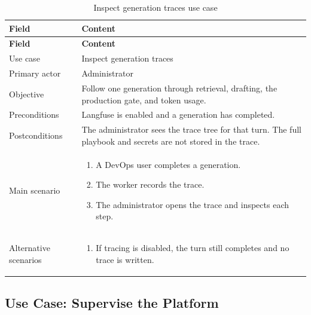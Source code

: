 \begingroup
\footnotesize
\renewcommand{\arraystretch}{1.15}
\begin{longtable}{|L{3.2cm}|L{11.6cm}|}
\caption{Inspect generation traces use case}
\label{tab:use-case-inspect-traces} \\
\hline
{}
\textbf{Field} & \textbf{Content} \\
\hline
\endfirsthead
\hline
{}
\textbf{Field} & \textbf{Content} \\
\hline
\endhead
Use case & Inspect generation traces \\
\hline
Primary actor & Administrator \\
\hline
Objective & Follow one generation through retrieval, drafting, the production gate, and token usage. \\
\hline
Preconditions & Langfuse is enabled and a generation has completed. \\
\hline
Postconditions & The administrator sees the trace tree for that turn. The full playbook and secrets are not stored in the trace. \\
\hline
Main scenario & \begin{enumerate}[leftmargin=1.5em,itemsep=0.1em,topsep=0.2em]
  \item A DevOps user completes a generation.
  \item The worker records the trace.
  \item The administrator opens the trace and inspects each step.
\end{enumerate} \\
\hline
Alternative scenarios & \begin{enumerate}[label=A\arabic*.,leftmargin=2em,itemsep=0.1em,topsep=0.2em]
  \item If tracing is disabled, the turn still completes and no trace is written.
\end{enumerate} \\
\hline
\end{longtable}
\endgroup

\subsection{Use Case: Supervise the Platform}

